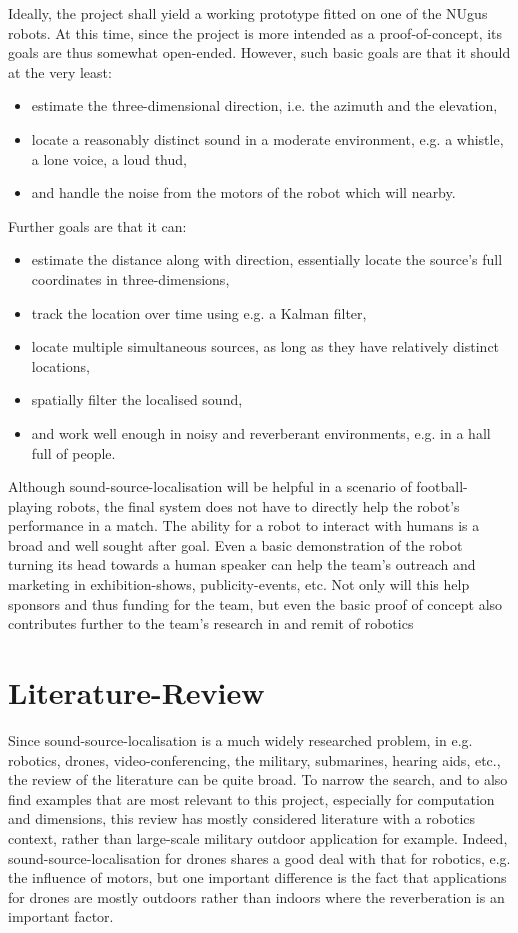 \documentclass{report}
\begin{document}
Ideally, the project shall yield a working prototype fitted on one of the NUgus robots. At this time, since the project is more intended as a proof-of-concept, its goals are thus somewhat open-ended. However, such basic goals are that it should at the very least:
\begin{itemize}
	\item estimate the three-dimensional direction, i.e. the azimuth and the elevation,
	\item locate a reasonably distinct sound in a moderate environment, e.g. a whistle, a lone voice, a loud thud,
	\item and handle the noise from the motors of the robot which will nearby.
\end{itemize}
Further goals are that it can:
\begin{itemize}
	\item estimate the distance along with direction, essentially locate the source's full coordinates in three-dimensions,
	\item track the location over time using e.g. a Kalman filter,
	\item locate multiple simultaneous sources, as long as they have relatively distinct locations,
	\item spatially filter the localised sound,
	\item and work well enough in noisy and reverberant environments, e.g. in a hall full of people.
\end{itemize}


Although sound-source-localisation will be helpful in a scenario of football-playing robots, the final system does not have to directly help the robot's performance in a match. The ability for a robot to interact with humans is a broad and well sought after goal. Even a basic demonstration of the robot turning its head towards a human speaker can help the team's outreach and marketing in exhibition-shows, publicity-events, etc. Not only will this help sponsors and thus funding for the team, but even the basic proof of concept also contributes further to the team's research in and remit of robotics 

\chapter{Literature-Review}

Since sound-source-localisation is a much widely researched problem, in e.g. robotics, drones, video-conferencing, the military, submarines, hearing aids, etc., the review of the literature can be quite broad. To narrow the search, and to also find examples that are most relevant to this project, especially for computation and dimensions, this review has mostly considered literature with a robotics context, rather than large-scale military outdoor application for example. Indeed, sound-source-localisation for drones shares a good deal with that for robotics, e.g. the influence of motors, but one important difference is the fact that applications for drones are mostly outdoors rather than indoors where the reverberation is an important factor.
\end{document}
